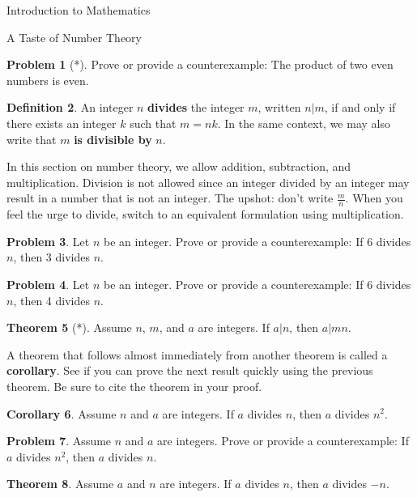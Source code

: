 \documentclass[11pt]{article}
\theoremstyle{definition}
\newtheorem{theorem}{Theorem}[section]
\newtheorem{corollary}[theorem]{Corollary}
\newtheorem{definition}[theorem]{Definition}
\newtheorem{problem}[theorem]{Problem}
\begin{document}
\begin{section}{Introduction to Mathematics}
\begin{subsection}{A Taste of Number Theory}
\begin{problem}[*]
Prove or provide a counterexample: The product of two even numbers is even. \end{problem}

\begin{definition}
An integer $n$ \textbf{divides} the integer $m$, written $n|m$, if and only if there exists an integer $k$ such that $m=nk$. In the same context, we may also write that $m$ \textbf{is divisible by} $n$.
\end{definition}

In this section on number theory, we allow addition, subtraction, and multiplication.  Division is not allowed since an integer divided by an integer may result in a number that is not an integer. The upshot: don't write $\frac{m}{n}$.  When you feel the urge to divide, switch to an equivalent formulation using multiplication.

\begin{problem}
Let $n$ be an integer.  Prove or provide a counterexample: If 6 divides $n$, then 3 divides $n$.\end{problem}

\begin{problem}
Let $n$ be an integer.  Prove or provide a counterexample: If 6 divides $n$, then 4 divides $n$.
\end{problem}

\begin{theorem}[*]
Assume $n$, $m$, and $a$ are integers.  If $a|n$, then $a|mn$.
\end{theorem}

A theorem that follows almost immediately from another theorem is called a \textbf{corollary}.  See if you can prove the next result quickly using the previous theorem.  Be sure to cite the theorem in your proof.

\begin{corollary}
Assume $n$ and $a$ are integers.  If $a$ divides $n$, then $a$ divides $n^2$.
\end{corollary}

\begin{problem}
Assume $n$ and $a$ are integers.  Prove or provide a counterexample:  If $a$ divides $n^2$, then $a$ divides $n$.
\end{problem}

\begin{theorem}
Assume $a$ and $n$ are integers. If $a$ divides $n$, then $a$ divides $-n$. 
\end{theorem}


\end{subsection}
\end{section}
\end{document}

